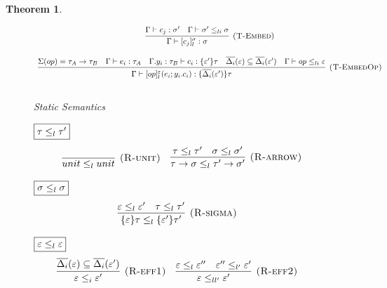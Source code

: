 \documentclass{article}
\newtheorem{theorem}{Theorem}[section]
\begin{document}
\begin{theorem}
\begin{figure}[H]
{\[\begin{array}{c}
\infer[\textsc{(T-Embed)}]
  {\Gamma\vdash [c_j]^\sigma_l : \sigma }
  {\Gamma \vdash c_j : \sigma' & \Gamma \vdash \sigma' \leq_{li} \sigma  } \\[3ex]
  
\infer[\textsc{(T-EmbedOp)}]
  {\Gamma\vdash [op]^\varepsilon_l(e_i; y_i.c_i) : \{\overline{\Delta_i}(\varepsilon')\}\tau }
  {\Sigma(op) = \tau_A \rightarrow \tau_B & \Gamma \vdash e_i : \tau_A & \Gamma. y_i:\tau_B\vdash c_i: \{\varepsilon'\}\tau & \overline{\Delta_i}(\varepsilon) \subseteq \overline{\Delta_i}(\varepsilon') & \Gamma \vdash op \leq_{li} \varepsilon} \\[3ex]
  
\end{array} \\[3ex]
\]
}


\caption{Static Semantics}
\label{wrap-static}
\end{figure}


\begin{figure}[H]
\footnotesize{
\noindent$\fbox{$\tau \leq_l \tau'$}$
\[
\begin{array}{c}

\infer[\textsc{(R-unit)}]
	{unit \leq_l unit}
	{} \quad

\infer[\textsc{(R-arrow)}]
	{\tau \rightarrow \sigma \leq_l \tau' \rightarrow \sigma'}
	{\tau \leq_l \tau' & \sigma \leq_l \sigma'}
  
\end{array} \\[3ex]
\]

\noindent$\fbox{$\sigma \leq_l \sigma$}$
\[
\begin{array}{c}

\infer[\textsc{(R-sigma)}]
	{\{\varepsilon\}\tau \leq_l \{\varepsilon'\}\tau'}
	{ \varepsilon \leq_l \varepsilon' & \tau \leq_l \tau' } \quad
  
\end{array} \\[3ex]
\]

\noindent$\fbox{$\varepsilon \leq_l \varepsilon$}$
\[
\begin{array}{c}

\infer[\textsc{(R-eff1)}]
	{\varepsilon \leq_i \varepsilon'}
	{ \overline{\Delta_i}(\varepsilon) \subseteq \overline{\Delta_i}(\varepsilon')  } \quad

\infer[\textsc{(R-eff2)}]
	{\varepsilon \leq_{ll'} \varepsilon'}
	{  \varepsilon \leq_l \varepsilon'' &   \varepsilon'' \leq_{l'} \varepsilon' } \quad
\end{array} \\[3ex]
\]
}



\end{figure}
\end{theorem}
\end{document}
